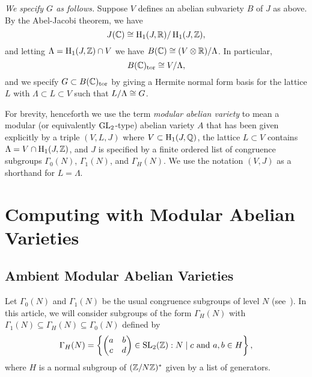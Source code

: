 \documentclass{article}
\begin{document}
	{\em We specify $G$ as follows.}
Suppose $V$ defines an abelian subvariety $B$ of $J$ as above.
By the Abel-Jacobi theorem, we have
$$
	J(\mathbb{C}) \cong \operatorname{H}_1(J, \mathbb{R}) / \operatorname{H}_1(J,\mathbb{Z}),
$$
and letting $\Lambda = \operatorname{H}_1(J,\mathbb{Z}) \cap V$ we have
$B(\mathbb{C}) \cong (V\otimes\mathbb{R}) / \Lambda$.
In particular,
$$
	B(\mathbb{C})_{\operatorname{tor}} \cong V/\Lambda,
$$
and we specify $G\subset B(\mathbb{C})_{\operatorname{tor}}$ by giving a Hermite normal form basis
for the lattice $L$ with $\Lambda \subset L\subset V$ such that $L/\Lambda
	\cong G$.


For brevity, henceforth we use the term {\em modular abelian variety}
to mean a modular (or equivalently $\operatorname{GL}_2$-type) abelian variety $A$
that has been given explicitly by a triple $(V,L,J)$ where $V\subset
	\operatorname{H}_1(J,\mathbb{Q})$, the lattice $L\subset V$ contains $\Lambda = V\cap
	\operatorname{H}_1(J,\mathbb{Z})$, and $J$ is specified by a finite ordered list of
congruence subgroups $\Gamma_0(N)$, $\Gamma_1(N)$, and $\Gamma_H(N)$.
We use the notation $(V,J)$ as a shorthand for $L=\Lambda$.



\section{Computing with Modular Abelian Varieties}

\subsection{Ambient Modular Abelian Varieties}
\label{sec:amb_modabvar}

Let $\Gamma_0(N)$ and $\Gamma_1(N)$ be the usual congruence subgroups of level
$N$ (see~\cite{stein:modform}). In this article, we will consider subgroups of
the form $\Gamma_H(N)$ with $\Gamma_1(N)\subseteq \Gamma_H(N)\subseteq
	\Gamma_0(N)$ defined by
\[
	\Gamma_H(N) =
	\left\{
	\begin{pmatrix}
		a & b \\
		c & d
	\end{pmatrix}
	\in \operatorname{SL}_2(\mathbb{Z}) :
	N\mid c \text{ and } a,b\in H
	\right\},
\]
where $H$ is a normal subgroup of $(\mathbb{Z}/N\mathbb{Z})^*$ given by a list of generators.
\end{document}
